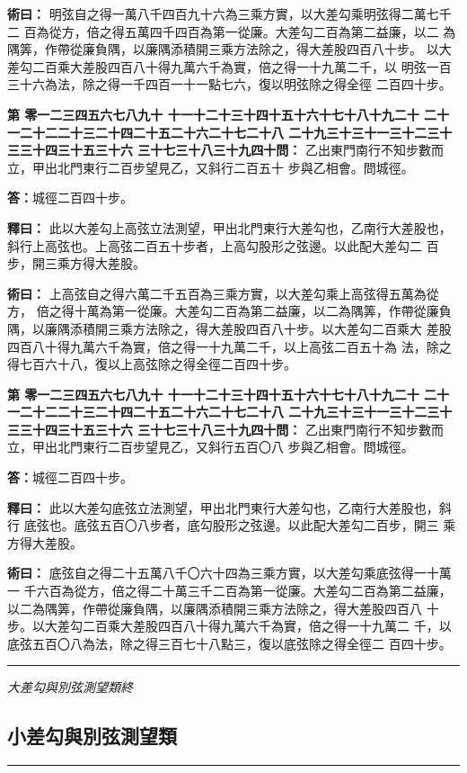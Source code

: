 \documentclass[11pt,a4paper]{article}
\newcommand{\longline}{\noindent\rule{\textwidth}{0.4pt}}
\newcounter{probnum}
\newcommand{\chnum}[1]{%
  \ifcase#1 零\or 一\or 二\or 三\or 四\or 五\or 六\or 七\or 八\or 九\or 十\or
    十一\or 十二\or 十三\or 十四\or 十五\or 十六\or 十七\or 十八\or 十九\or 二十\or
    二十一\or 二十二\or 二十三\or 二十四\or 二十五\or 二十六\or 二十七\or 二十八\or
    二十九\or 三十\or 三十一\or 三十二\or 三十三\or 三十四\or 三十五\or 三十六\or
    三十七\or 三十八\or 三十九\or 四十\fi}
\newcommand{\problem}[1]{\stepcounter{probnum}\par\noindent\textbf{第\chnum{\value{probnum}}問：}#1\par}
\newcommand{\answer}[1]{\par\noindent\textbf{答：}#1\par}
\newcommand{\shiyi}[1]{\par\noindent\textbf{釋曰：}#1\par}
\newcommand{\shuyue}[1]{\par\noindent\textbf{術曰：}#1\par}
\begin{document}
\shuyue{
明弦自之得一萬八千四百九十六為三乘方實，以大差勾乘明弦得二萬七千二
百為從方，倍之得五萬四千四百為第一從廉。大差勾二百為第二益廉，以二
為隅筭，作帶從廉負隅，以廉隅添積開三乘方法除之，得大差股四百八十步。
以大差勾二百乘大差股四百八十得九萬六千為實，倍之得一十九萬二千，以
明弦一百三十六為法，除之得一千四百一十一點七六，復以明弦除之得全徑
二百四十步。
}

\vspace{0.3cm}
\problem{
乙出東門南行不知步數而立，甲出北門東行二百步望見乙，又斜行二百五十
步與乙相會。問城徑。
}

\answer{城徑二百四十步。}

\shiyi{
此以大差勾上高弦立法測望，甲出北門東行大差勾也，乙南行大差股也，
斜行上高弦也。上高弦二百五十步者，上高勾股形之弦邊。以此配大差勾二
百步，開三乘方得大差股。
}

\shuyue{
上高弦自之得六萬二千五百為三乘方實，以大差勾乘上高弦得五萬為從方，
倍之得十萬為第一從廉。大差勾二百為第二益廉，以二為隅筭，作帶從廉負
隅，以廉隅添積開三乘方法除之，得大差股四百八十步。以大差勾二百乘大
差股四百八十得九萬六千為實，倍之得一十九萬二千，以上高弦二百五十為
法，除之得七百六十八，復以上高弦除之得全徑二百四十步。
}

\vspace{0.3cm}
\problem{
乙出東門南行不知步數而立，甲出北門東行二百步望見乙，又斜行五百〇八
步與乙相會。問城徑。
}

\answer{城徑二百四十步。}

\shiyi{
此以大差勾底弦立法測望，甲出北門東行大差勾也，乙南行大差股也，斜行
底弦也。底弦五百〇八步者，底勾股形之弦邊。以此配大差勾二百步，開三
乘方得大差股。
}

\shuyue{
底弦自之得二十五萬八千〇六十四為三乘方實，以大差勾乘底弦得一十萬一
千六百為從方，倍之得二十萬三千二百為第一從廉。大差勾二百為第二益廉，
以二為隅筭，作帶從廉負隅，以廉隅添積開三乘方法除之，得大差股四百八
十步。以大差勾二百乘大差股四百八十得九萬六千為實，倍之得一十九萬二
千，以底弦五百〇八為法，除之得三百七十八點三，復以底弦除之得全徑二
百四十步。
}

\vspace{0.5cm}
\longline
\begin{center}
\textit{大差勾與別弦測望類終}
\end{center}

\newpage
\setcounter{probnum}{0}

\subsection*{小差勾與別弦測望類}
\vspace{0.3cm}
\longline
\vspace{0.3cm}
\end{document}
